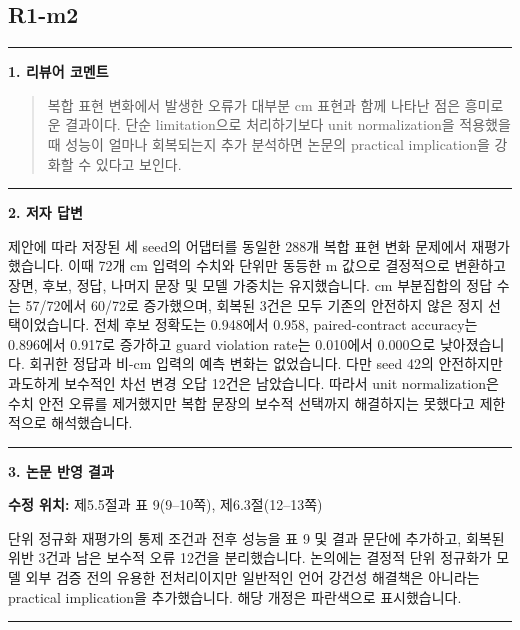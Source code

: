 \documentclass[11pt]{article}
\newcommand{\fieldheading}[2]{%
  \par\medskip\noindent
  {\color{#1}\rule{3pt}{1.25em}}\hspace{0.55em}\textbf{#2}\par\smallskip}
\newenvironment{reviewitem}[1]
  {\subsection*{#1}}
  {\par\medskip\hrule\bigskip}
\newenvironment{reviewercomment}
  {\fieldheading{reviewercolor}{1. 리뷰어 코멘트}%
   \begin{quote}}
  {\end{quote}}
\newenvironment{authorresponse}
  {\fieldheading{responsecolor}{2. 저자 답변}}
  {\par}
\newenvironment{manuscriptrevision}[1]
  {\fieldheading{revisioncolor}{3. 논문 반영 결과}%
   \textbf{수정 위치:} #1\par\smallskip}
  {\par}
\begin{document}
\begin{reviewitem}{R1-m2}
  \begin{reviewercomment}
    복합 표현 변화에서 발생한 오류가 대부분 cm 표현과 함께 나타난 점은 흥미로운
    결과이다. 단순 limitation으로 처리하기보다 unit normalization을 적용했을 때
    성능이 얼마나 회복되는지 추가 분석하면 논문의 practical implication을 강화할
    수 있다고 보인다.
  \end{reviewercomment}

  \begin{authorresponse}
    제안에 따라 저장된 세 seed의 어댑터를 동일한 288개 복합 표현 변화 문제에서
    재평가했습니다. 이때 72개 cm 입력의 수치와 단위만 동등한 m 값으로 결정적으로
    변환하고 장면, 후보, 정답, 나머지 문장 및 모델 가중치는 유지했습니다. cm
    부분집합의 정답 수는 57/72에서 60/72로 증가했으며, 회복된 3건은 모두 기존의
    안전하지 않은 정지 선택이었습니다. 전체 후보 정확도는 0.948에서 0.958,
    paired-contract accuracy는 0.896에서 0.917로 증가하고 guard violation rate는
    0.010에서 0.000으로 낮아졌습니다. 회귀한 정답과 비-cm 입력의 예측 변화는
    없었습니다. 다만 seed 42의 안전하지만 과도하게 보수적인 차선 변경 오답
    12건은 남았습니다. 따라서 unit normalization은 수치 안전 오류를 제거했지만
    복합 문장의 보수적 선택까지 해결하지는 못했다고 제한적으로 해석했습니다.
  \end{authorresponse}

  \begin{manuscriptrevision}{제5.5절과 표 9(9--10쪽), 제6.3절(12--13쪽)}
    단위 정규화 재평가의 통제 조건과 전후 성능을 표 9 및 결과 문단에
    추가하고, 회복된 위반 3건과 남은 보수적 오류 12건을 분리했습니다. 논의에는
    결정적 단위 정규화가 모델 외부 검증 전의 유용한 전처리이지만 일반적인 언어
    강건성 해결책은 아니라는 practical implication을 추가했습니다. 해당 개정은
    파란색으로 표시했습니다.
  \end{manuscriptrevision}
\end{reviewitem}
\end{document}
